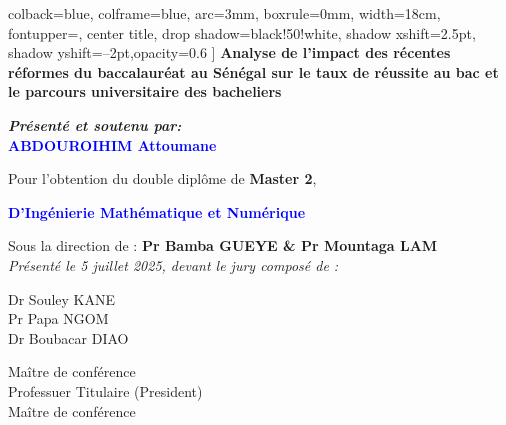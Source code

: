 \documentclass[a4paper,12pt]{report}                %
\begin{document}
\begin{titlepage}
\begin{center}
\begin{tcolorbox}
            colback=blue,
            colframe=blue,
            arc=3mm,
            boxrule=0mm,
            width=18cm,
            fontupper=\color{white}, 
            center title, 
            drop shadow={black!50!white, shadow xshift=2.5pt, shadow yshift=--2pt,opacity=0.6}
            ]
            \centering
            \textbf{\LARGE Analyse de l'impact des récentes réformes du baccalauréat au Sénégal sur le taux de réussite au bac et le parcours universitaire des bacheliers}
        \end{tcolorbox}
        \vspace{1.5cm}
        \textbf{\textit{\large Présenté et soutenu par:}}\\[0.5cm]
        \textcolor{blue}{\textbf{\LARGE ABDOUROIHIM Attoumane}}
    \end{center}
    \vspace{1cm}
    \begin{flushleft}
        \hspace{0.5cm} 
        \textmd{\large Pour l'obtention du double diplôme de \textbf{\Large Master 2},}
        \begin{center}
            \textmd{\Large \textcolor{blue}{\textbf{D'Ingénierie Mathématique et Numérique}}}
        \end{center}
        \vspace{0.5cm}
        \hspace{0.5cm}
        \textmd{\large Sous la direction de : \textbf{\Large Pr Bamba GUEYE \& Pr Mountaga LAM}}\\  
        \vspace{1cm}
        \hspace{1cm}
        \textit{\large Présenté le 5 juillet 2025, devant le jury composé de :}\\
        \vspace{0.5cm}
        \begin{center}
        \hspace{3cm}
        \begin{minipage}{0.3\textwidth}
            \textmd{\Large Dr Souley KANE }\\[0.3cm]
            \textmd{\Large Pr Papa NGOM}\\[0.3cm]
            \textmd{\Large Dr Boubacar DIAO}
        \end{minipage}
        \hfill
        \begin{minipage}{0.4\textwidth}
            \textmd{\large Maître de conférence}\\[0.3cm]
            \textmd{\large Professuer Titulaire (President)}\\[0.3cm]
            \textmd{\large Maître de conférence}
        \end{minipage}
    \end{center}
    \end{flushleft}
    
\end{titlepage}
\end{document}
